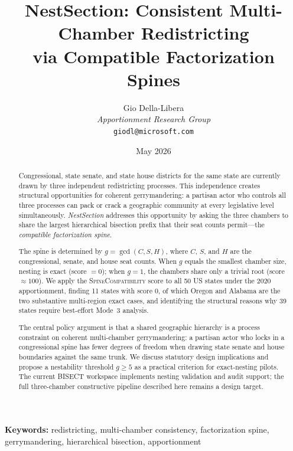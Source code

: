 \documentclass[12pt]{article}
\title{\textbf{NestSection: Consistent Multi-Chamber Redistricting\\
via Compatible Factorization Spines}}
\author{%
  Gio Della-Libera\\
  \textit{Apportionment Research Group}\\
  \small\texttt{giodl@microsoft.com}
}
\date{May 2026}
\theoremstyle{remark}
\renewcommand{\gcd}{\operatorname{gcd}}
\begin{document}
\maketitle

\begin{abstract}
Congressional, state senate, and state house districts for the same state are
currently drawn by three independent redistricting processes.  This independence
creates structural opportunities for coherent gerrymandering: a partisan actor
who controls all three processes can pack or crack a geographic community at
every legislative level simultaneously.  \emph{NestSection} addresses this
opportunity by asking the three chambers to share the largest hierarchical
bisection prefix that their seat counts permit---the \emph{compatible
factorization spine}.

The spine is determined by $g = \gcd(C, S, H)$, where $C$, $S$, and $H$ are
the congressional, senate, and house seat counts.  When $g$ equals the smallest
chamber size, nesting is exact (score $= 0$); when $g = 1$, the chambers share
only a trivial root (score $\approx 100$).  We apply the
\textsc{SpineCompatibility} score to all 50 US states under the 2020
apportionment, finding 11 states with score 0, of which Oregon and Alabama
are the two substantive multi-region exact cases, and identifying the
structural reasons why 39 states require best-effort Mode~3 analysis.

The central policy argument is that a shared geographic hierarchy is a
process constraint on coherent multi-chamber gerrymandering: a partisan actor
who locks in a congressional spine has fewer degrees of freedom when drawing
state senate and house boundaries against the same trunk.  We discuss statutory
design implications and propose a nestability threshold $g \geq 5$ as a
practical criterion for exact-nesting pilots.  The current BISECT workspace
implements nesting validation and audit support; the full three-chamber
constructive pipeline described here remains a design target.
\end{abstract}

\bigskip
\noindent\textbf{Keywords:} redistricting, multi-chamber consistency, factorization spine,
gerrymandering, hierarchical bisection, apportionment

\tableofcontents
\newpage










\end{document}
